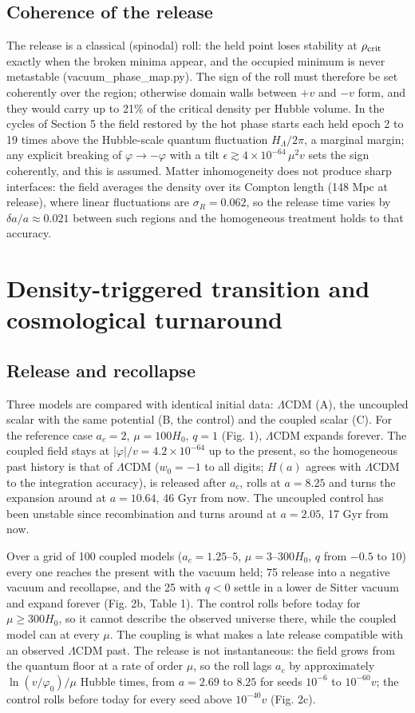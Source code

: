 \documentclass[pdflatex,sn-mathphys-num]{sn-jnl}
\begin{document}
\subsection{Coherence of the release}
The release is a classical (spinodal) roll: the held point loses stability at $\rho_{\rm crit}$ exactly when the broken minima appear, and the occupied minimum is never metastable (vacuum\_phase\_map.py). The sign of the roll must therefore be set coherently over the region; otherwise domain walls between $+v$ and $-v$ form, and they would carry up to 21\% of the critical density per Hubble volume. In the cycles of Section 5 the field restored by the hot phase starts each held epoch 2 to 19 times above the Hubble-scale quantum fluctuation $H_\Lambda/2\pi$, a marginal margin; any explicit breaking of $\varphi\to-\varphi$ with a tilt $\epsilon\gtrsim4\times10^{-64}\,\mu^2v$ sets the sign coherently, and this is assumed. Matter inhomogeneity does not produce sharp interfaces: the field averages the density over its Compton length (148 Mpc at release), where linear fluctuations are $\sigma_R=0.062$, so the release time varies by $\delta a/a\approx0.021$ between such regions and the homogeneous treatment holds to that accuracy.

\section{Density-triggered transition and cosmological turnaround}
\subsection{Release and recollapse}
Three models are compared with identical initial data: $\Lambda$CDM (A), the uncoupled scalar with the same potential (B, the control) and the coupled scalar (C). For the reference case $a_c=2$, $\mu=100H_0$, $q=1$ (Fig. 1), $\Lambda$CDM expands forever. The coupled field stays at $|\varphi|/v=4.2\times10^{-64}$ up to the present, so the homogeneous past history is that of $\Lambda$CDM ($w_0=-1$ to all digits; $H(a)$ agrees with $\Lambda$CDM to the integration accuracy), is released after $a_c$, rolls at $a=8.25$ and turns the expansion around at $a=10.64$, 46 Gyr from now. The uncoupled control has been unstable since recombination and turns around at $a=2.05$, 17 Gyr from now.

Over a grid of 100 coupled models ($a_c=1.25$--$5$, $\mu=3$--$300H_0$, $q$ from $-0.5$ to $10$) every one reaches the present with the vacuum held; 75 release into a negative vacuum and recollapse, and the 25 with $q<0$ settle in a lower de Sitter vacuum and expand forever (Fig. 2b, Table 1). The control rolls before today for $\mu\ge300H_0$, so it cannot describe the observed universe there, while the coupled model can at every $\mu$. The coupling is what makes a late release compatible with an observed $\Lambda$CDM past. The release is not instantaneous: the field grows from the quantum floor at a rate of order $\mu$, so the roll lags $a_c$ by approximately $\ln(v/\varphi_0)/\mu$ Hubble times, from $a=2.69$ to $8.25$ for seeds $10^{-6}$ to $10^{-60}v$; the control rolls before today for every seed above $10^{-40}v$ (Fig. 2c).
\end{document}

